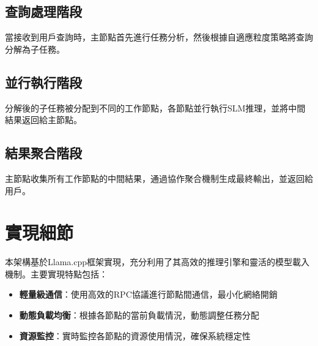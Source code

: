 \subsection{查詢處理階段}
當接收到用戶查詢時，主節點首先進行任務分析，然後根據自適應粒度策略將查詢分解為子任務。

\subsection{並行執行階段}
分解後的子任務被分配到不同的工作節點，各節點並行執行SLM推理，並將中間結果返回給主節點。

\subsection{結果聚合階段}
主節點收集所有工作節點的中間結果，通過協作聚合機制生成最終輸出，並返回給用戶。

\section{實現細節}

本架構基於Llama.cpp框架實現，充分利用了其高效的推理引擎和靈活的模型載入機制。主要實現特點包括：

\begin{itemize}
    \item \textbf{輕量級通信}：使用高效的RPC協議進行節點間通信，最小化網絡開銷
    \item \textbf{動態負載均衡}：根據各節點的當前負載情況，動態調整任務分配
    \item \textbf{資源監控}：實時監控各節點的資源使用情況，確保系統穩定性
\end{itemize} 